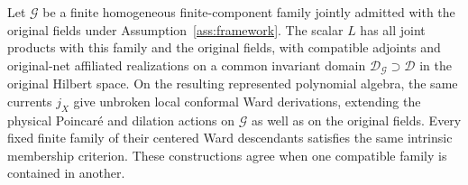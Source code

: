 \begin{proposition}
\label{R:compatible-families}
Let $\mathcal G$ be a finite homogeneous finite-component family
jointly admitted with the original fields under
Assumption~\ref{ass:framework}.  The scalar $L$ has all joint products
with this family and the original fields, with compatible adjoints and
original-net affiliated realizations on a common invariant domain
$\mathcal D_{\mathcal G}\supset\mathcal D$ in the original Hilbert
space.  On the resulting represented polynomial algebra, the same
currents $j_X$ give unbroken local conformal Ward derivations,
extending the physical Poincar\'e and dilation actions on
$\mathcal G$ as well as on the original fields.  Every fixed finite
family of their centered Ward descendants satisfies the same intrinsic
membership criterion.  These constructions agree when one compatible
family is contained in another.
\end{proposition}

